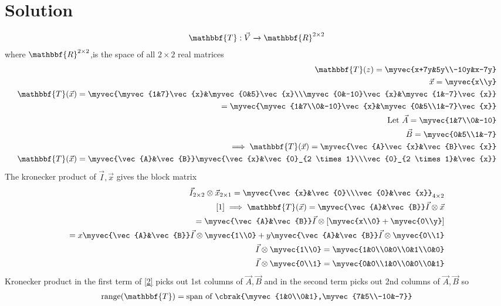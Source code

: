 \documentclass[journal,12pt,twocolumn]{IEEEtran}
\begin{document}
\section{Solution}
\begin{align}
    \mathbbf{T}:\vec{V}\xrightarrow{}\mathbbf{R}^{2 \times 2}
\end{align}
where $\mathbbf{R}^{2 \times 2}$,is the space of all $2 \times 2$ real matrices\\
\begin{align}
 \mathbbf{T}(z)=\myvec{x+7y&5y\\-10y&x-7y}\\
 \vec{x}=\myvec{x\\y}\\
 \mathbbf{T}(\vec{x})=\myvec{\myvec{1&7}\vec{x}&\myvec{0&5}\vec{x}\\\myvec{0&-10}\vec{x}&\myvec{1&-7}\vec{x}}\\
 =\myvec{\myvec{1&7\\0&-10}\vec{x}&\myvec{0&5\\1&-7}\vec{x}}\\
 \text{Let } \vec{A}=\myvec{1&7\\0&-10}\\
 \vec{B}=\myvec{0&5\\1&-7}\\
 \implies  \mathbbf{T}(\vec{x})=\myvec{\vec{A}\vec{x}&\vec{B}\vec{x}}\\
  \mathbbf{T}(\vec{x})=\myvec{\vec{A}&\vec{B}}\myvec{\vec{x}&\vec{0}_{2 \times 1}\\\vec{0}_{2 \times 1}&\vec{x}}\label{1}
\end{align}
The kronecker product of $\vec{I},\vec{x}$ gives the block matrix
\begin{align}
    \vec{I}_{2 \times 2}\otimes \vec{x}_{2\times 1}=\myvec{\vec{x}&\vec{0}\\\vec{0}&\vec{x}}_{4 \times 2}\\
    \eqref{1} \implies  \mathbbf{T}(\vec{x})= \myvec{\vec{A}&\vec{B}}\vec{I}\otimes \vec{x}\\
    =\myvec{\vec{A}&\vec{B}}\vec{I}\otimes\left[\myvec{x\\0}+\myvec{0\\y}\right]\\
   =x\myvec{\vec{A}&\vec{B}}  \vec{I}\otimes \myvec{1\\0}+y\myvec{\vec{A}&\vec{B}}  \vec{I}\otimes \myvec{0\\1}\label{2}\\
   \vec{I}\otimes \myvec{1\\0}=\myvec{1&0\\0&0\\0&1\\0&0}\\
   \vec{I}\otimes \myvec{0\\1}=\myvec{0&0\\1&0\\0&0\\0&1}
\end{align}
Kronecker product in the first term of \eqref{2} picks out 1st columns of $\vec{A},\vec{B}$ and in the second term picks out 2nd columns of $\vec{A},\vec{B}$ so
\begin{align}
    \text{range}(\mathbbf{T})=\text{span of }\cbrak{\myvec{1&0\\0&1},\myvec{7&5\\-10&-7}}
\end{align}
\end{document}
